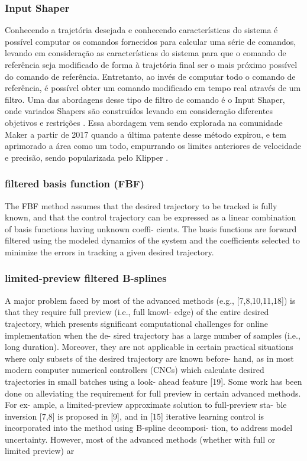 \subsubsection{Input Shaper}
Conhecendo a trajetória desejada e conhecendo características 
do sistema é possível computar os comandos fornecidos para 
calcular uma série de comandos, levando em consideração as 
características do sistema para que o comando de referência 
seja modificado de forma à trajetória final ser o mais próximo 
possível do comando de referência. Entretanto, ao invés de 
computar todo o comando de referência, é possível obter um 
comando modificado em tempo real através de um filtro. 
Uma das abordagens desse tipo de filtro de comando é o 
Input Shaper, onde variados Shapers são construídos levando 
em consideração diferentes objetivos e restrições 
\cite{singhose97}.
Essa abordagem vem sendo explorada na comunidade Maker a partir de 2017 
quando a última patente desse método expirou, e tem aprimorado a área como
um todo, empurrando os limites anteriores de velocidade e precisão,
sendo popularizada pelo Klipper \cite{klipperkinematic}.

\subsubsection{filtered basis function (FBF)}
The FBF method assumes that the desired trajectory to be tracked
is fully known, and that the control trajectory can be expressed as
a linear combination of basis functions having unknown coeffi-
cients. The basis functions are forward filtered using the modeled
dynamics of the system and the coefficients selected to minimize
the errors in tracking a given desired trajectory.

\subsubsection{limited-preview filtered B-splines}
A major problem faced by most of the advanced methods
(e.g., [7,8,10,11,18]) is that they require full preview (i.e., full knowl-
edge) of the entire desired trajectory, which presents significant
computational challenges for online implementation when the de-
sired trajectory has a large number of samples (i.e., long duration).
Moreover, they are not applicable in certain practical situations
where only subsets of the desired trajectory are known before-
hand, as in most modern computer numerical controllers (CNCs)
which calculate desired trajectories in small batches using a look-
ahead feature [19]. Some work has been done on alleviating the
requirement for full preview in certain advanced methods. For ex-
ample, a limited-preview approximate solution to full-preview sta-
ble inversion [7,8] is proposed in [9], and in [15] iterative learning
control is incorporated into the method using B-spline decomposi-
tion, to address model uncertainty. However, most of the advanced
methods (whether with full or limited preview) ar


